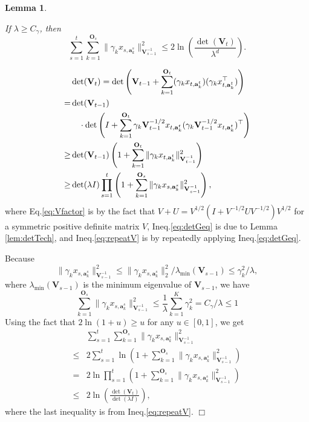 \documentclass{article}
\newcommand{\ba}{\mathbf{a}}
\newcommand{\bO}{\mathbf{O}}
\newcommand{\bV}{\mathbf{V}}
\newcommand{\norm}[1]{\| #1 \|}
\newtheorem{lemma}[theorem]{Lemma}%
\newenvironment{proof}{\noindent {\textbf{Proof. }}}{$\Box$ \medskip}
\newcommand{\CLemmaSumXiEstimateInDet}{
  If $\lambda \geq C_\gamma$, then
  $$
    \sum_{s=1}^t \sum_{k=1}^{\bO_s} \norm{\gamma_k x_{s,\ba_{k}^s}}_{\bV_{s-1}^{-1}}^2 \leq 2\ln \left(\frac{\det(\bV_t)}{\lambda^d} \right).
  $$
}
\begin{document}
\begin{lemma} %
  \label{lem:SumXiEstimateInDet}
  \CLemmaSumXiEstimateInDet
\end{lemma}
\begin{proof}
	\begin{align}
	&\det(\bV_t) = \det\left(\bV_{t-1} + \sum_{k=1}^{\bO_t} (\gamma_k x_{t,\ba_k^{t}})(\gamma_k x_{t, \ba_k^{t}}^{\top}) \right) \nonumber \\
	=&\det(\bV_{t-1}) \notag \\
	&~~~\cdot \det \left(I + \sum_{k=1}^{\bO_t} \gamma_k \bV_{t-1}^{-1/2}x_{t,\ba_{k}^{t}} (\gamma_k \bV_{t-1}^{-1/2}x_{t,\ba_{k}^{t}})^{\top} \right) \label{eq:Vfactor}\\
	\geq& \det(\bV_{t-1}) \left(1 + \sum_{k=1}^{\bO_t} \norm{\gamma_k x_{t,\ba_k^t}}_{\bV_{t-1}^{-1}}^2 \right) \label{eq:detGeq} \\
	\geq& \det(\lambda I)\prod_{s=1}^{t} \left(1 + \sum_{k=1}^{\bO_s} \norm{\gamma_k x_{s,\ba_k^s}}_{\bV_{s-1}^{-1}}^2 \right), \label{eq:repeatV}
	\end{align}
	where Eq.\eqref{eq:Vfactor} is by the fact that $V+U = V^{1/2} (I + V^{-1/2} U V^{-1/2}) V^{1/2}$ for a symmetric positive definite matrix $V$, Ineq.\eqref{eq:detGeq} is due to Lemma \ref{lem:detTech}, and Ineq.\eqref{eq:repeatV} is by repeatedly applying Ineq.\eqref{eq:detGeq}.
	
	Because
	$$
	\norm{\gamma_k x_{s,\ba_k^s}}_{\bV_{s-1}^{-1}}^2 \leq \norm{\gamma_k x_{s,\ba_k^s}}_2^2/\lambda_{\min}(\bV_{s-1}) \leq \gamma_k^2 /\lambda,
	$$
	where $\lambda_{\min}(\bV_{s-1})$ is the minimum eigenvalue of $\bV_{s-1}$,  we have 
	$$
	\sum_{k=1}^{\bO_s} \norm{\gamma_k x_{s,\ba_k^s}}_{\bV_{s-1}^{-1}}^2 \leq \frac{1}{\lambda} \sum_{k=1}^{K} \gamma_k^2 = C_\gamma /\lambda \leq 1
	$$
	Using the fact that $ 2\ln(1+u) \geq u$ for any $u \in [0,1]$, we get
	\begin{align*}
	&\sum_{s=1}^t \sum_{k=1}^{\bO_s}\norm{\gamma_k x_{s,\ba_{k}^s}}_{\bV_{s-1}^{-1}}^2 \\
	\leq &2\sum_{s=1}^t\ln \left(1 + \sum_{k=1}^{\bO_s} \norm{\gamma_k x_{s,\ba_k^s}}_{\bV_{s-1}^{-1}}^2 \right)\\
	= &2 \ln \prod_{s=1}^{t} \left(1 + \sum_{k=1}^{\bO_s} \norm{\gamma_k x_{s,\ba_k^s}}_{\bV_{s-1}^{-1}}^2 \right) \\
	\le& 2 \ln \left(\frac{\det(\bV_t)}{\det(\lambda I)} \right),
	\end{align*}
	where the last inequality is from Ineq.\eqref{eq:repeatV}.
\end{proof}
\end{document}
